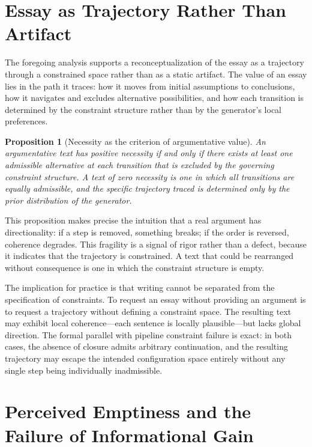 \documentclass[12pt, oneside]{article}
\theoremstyle{plain}
\newtheorem{proposition}[theorem]{Proposition}
\theoremstyle{definition}
\theoremstyle{remark}
\begin{document}
\section{Essay as Trajectory Rather Than Artifact}

The foregoing analysis supports a reconceptualization of the essay as a trajectory through
a constrained space rather than as a static artifact. The value of an essay lies in the
path it traces: how it moves from initial assumptions to conclusions, how it navigates and
excludes alternative possibilities, and how each transition is determined by the constraint
structure rather than by the generator's local preferences.

\begin{proposition}[Necessity as the criterion of argumentative value]
An argumentative text has positive necessity if and only if there exists at least one
admissible alternative at each transition that is excluded by the governing constraint
structure. A text of zero necessity is one in which all transitions are equally admissible,
and the specific trajectory traced is determined only by the prior distribution of the
generator.
\end{proposition}

This proposition makes precise the intuition that a real argument has directionality: if
a step is removed, something breaks; if the order is reversed, coherence degrades. This
fragility is a signal of rigor rather than a defect, because it indicates that the
trajectory is constrained. A text that could be rearranged without consequence is one in
which the constraint structure is empty.

The implication for practice is that writing cannot be separated from the specification of
constraints. To request an essay without providing an argument is to request a trajectory
without defining a constraint space. The resulting text may exhibit local coherence---each
sentence is locally plausible---but lacks global direction. The formal parallel with
pipeline constraint failure is exact: in both cases, the absence of closure admits arbitrary
continuation, and the resulting trajectory may escape the intended configuration space
entirely without any single step being individually inadmissible.

\section{Perceived Emptiness and the Failure of Informational Gain}
\end{document}
